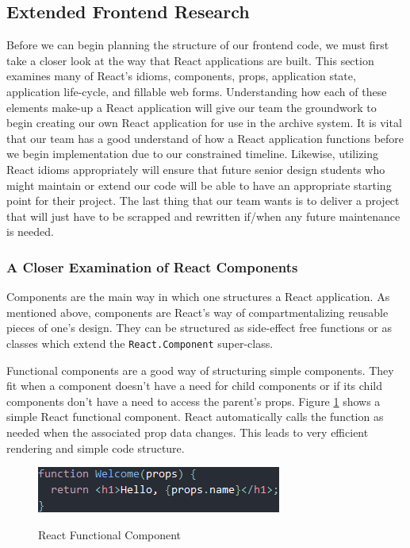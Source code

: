 \documentclass[12pt]{report}
\begin{document}
\subsection*{Extended Frontend Research}

Before we can begin planning the structure of our frontend code, we must first take a closer look at the way that React applications are built. This section examines many of React's idioms, components, props, application state, application life-cycle, and fillable web forms. Understanding how each of these elements make-up a React application will give our team the groundwork to begin creating our own React application for use in the archive system. It is vital that our team has a good understand of how a React application functions before we begin implementation due to our constrained timeline. Likewise, utilizing React idioms appropriately will ensure that future senior design students who might maintain or extend our code will be able to have an appropriate starting point for their project. The last thing that our team wants is to deliver a project that will just have to be scrapped and rewritten if/when any future maintenance is needed.

\subsubsection*{A Closer Examination of React Components}

Components are the main way in which one structures a React application. As mentioned above, components are React's way of compartmentalizing reusable pieces of one's design. They can be structured as side-effect free functions or as classes which extend the \texttt{React.Component} super-class.

Functional components are a good way of structuring simple components. They fit when a component doesn't have a need for child components or if its child components don't have a need to access the parent's props. Figure \ref{fig:reactfunctionalcomponent} shows a simple React functional component.\cite{reactcomponentsandprops} React automatically calls the function as needed when the associated prop data changes. This leads to very efficient rendering and simple code structure.

\begin{figure}[h]
	\centering
	\caption{React Functional Component}
	\includegraphics[scale=0.5]{react_functional_component}
	\label{fig:reactfunctionalcomponent}
\end{figure}
\end{document}
